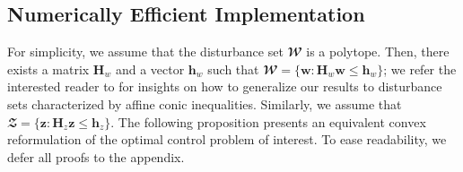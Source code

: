 \documentclass[conference]{IEEEtran}
\begin{document}
\subsection{Numerically Efficient Implementation}
\label{subsec:numerical_implementation}
For simplicity, we assume that the disturbance set $\mathbfcal{W}$ is a polytope. Then, there exists a matrix $\mathbf{H}_w$ and a vector $\mathbf{h}_w$ such that $\mathbfcal{W} = \{\mathbf{w} : \mathbf{H}_w \mathbf{w} \leq \mathbf{h}_w\}$; we refer the interested reader to \cite[Ch. 6]{goulart2007affine} for insights on how to generalize our results to disturbance sets characterized by affine conic inequalities.
Similarly, we assume that $\mathbfcal{Z} = \{\mathbf{z} : \mathbf{H}_z \mathbf{z} \leq \mathbf{h}_z\}$.
The following proposition presents an equivalent convex reformulation of the optimal control problem of interest. To ease readability, we defer all proofs to the appendix.
\end{document}
